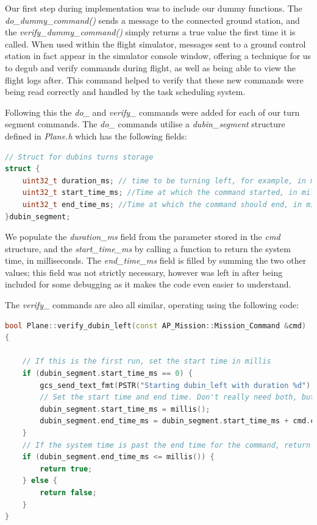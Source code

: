 Our first step during implementation was to include our dummy functions. The \textit{do\_dummy\_command()} sends a message to the connected ground station, and the \textit{verify\_dummy\_command()} simply returns a true value the first time it is called. When used within the flight simulator, messages sent to a ground control station in fact appear in the simulator console window, offering a technique for us to degub and verify commands during flight, as well as being able to view the flight logs after. This command helped to verify that these new commands were being read correctly and handled by the task scheduling system. 

Following this the \textit{do\_} and \textit{verify\_} commands were added for each of our turn segment commands. The \textit{do\_} commands utilise a \textit{dubin\_segment} structure defined in \textit{Plane.h} which has the following fields:

\begin{minipage}{\linewidth}
\begin{lstlisting}[language=C++]
// Struct for dubins turns storage
struct {
    uint32_t duration_ms; // time to be turning left, for example, in milliseconds
    uint32_t start_time_ms; //Time at which the command started, in milliseconds
    uint32_t end_time_ms; //Time at which the command should end, in milliseconds
}dubin_segment;
\end{lstlisting}
\end{minipage}

We populate the \textit{duration\_ms} field from the parameter stored in the \textit{cmd} structure, and the \textit{start\_time\_ms} by calling a function to return the system time, in milliseconds. The \textit{end\_time\_ms} field is filled by summing the two other values; this field was not strictly necessary, however was left in after being included for some debugging as it makes the code even easier to understand. 

The \textit{verify\_} commands are also all similar, operating using the following code:

\begin{minipage}{\linewidth}
\begin{lstlisting}[language=C++]
bool Plane::verify_dubin_left(const AP_Mission::Mission_Command &cmd)
{

    // If this is the first run, set the start time in millis
    if (dubin_segment.start_time_ms == 0) {
        gcs_send_text_fmt(PSTR("Starting dubin_left with duration %d"), dubin_segment.duration_ms);
        // Set the start time and end time. Don't really need both, but using for debugging
        dubin_segment.start_time_ms = millis();
        dubin_segment.end_time_ms = dubin_segment.start_time_ms + cmd.content.dubins.duration_ms;
    }
    // If the system time is past the end time for the command, return true
    if (dubin_segment.end_time_ms <= millis()) {
        return true;
    } else {
        return false;
    }
} 
\end{lstlisting}
\end{minipage}

